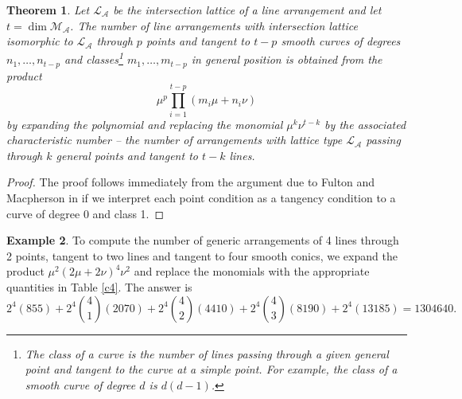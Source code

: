 \documentclass[12pt]{article}
\theoremstyle{plain}
\newtheorem{theorem}{Theorem}
\theoremstyle{definition}
\newtheorem{example}[theorem]{Example}
\newcommand{\A}{\mathcal{A}}
\newcommand{\M}{\mathcal{M}}
\renewcommand{\L}{\mathcal{L}}
\newcommand{\MLA}{\M_{\A}}
\begin{document}
\begin{theorem} \label{FKMt}
Let $\L_\A$ be the intersection lattice of a line arrangement and let
$t = \dim \MLA$. The number of line arrangements with intersection
lattice isomorphic to $\L_\A$ through $p$ points and tangent to $t-p$
smooth curves of degrees $n_1, \ldots, n_{t-p}$ and classes\footnote{The class of a curve is the number of lines passing
through a given general point and tangent to the curve at a simple
point. For example, the class of a smooth curve of degree $d$ is $d(d-1)$.} $m_1,
\ldots, m_{t-p}$ in general position is obtained from the
product $$ \mu^p \prod_{i=1}^{t-p}  (m_i \mu + n_i\nu) $$ by expanding the
polynomial and replacing the monomial $\mu^k \nu^{t-k}$ by the
associated characteristic number -- the number
of arrangements with lattice type $\L_\A$ passing through $k$ general
points and tangent to $t-k$ lines.    
\end{theorem}

\begin{proof}
The proof follows immediately from the argument due to Fulton
and Macpherson in \cite[section 10.4]{Fulton} if we interpret each
point condition as a tangency condition to a curve of degree 0 and
class 1.
\end{proof}

\begin{example}
To compute the number of generic arrangements of 4 lines through 2
points, tangent to two lines and tangent to four smooth conics, we
expand the product $\mu^2(2\mu + 2\nu)^4\nu^2$ and replace the
monomials with the appropriate quantities in Table \ref{c4}. The
answer
is $$2^4(855)+2^4\binom{4}{1}(2070)+2^4\binom{4}{2}(4410)+2^4\binom{4}{3}(8190)+
2^4(13185) = 1304640. $$
\end{example}
\end{document}
